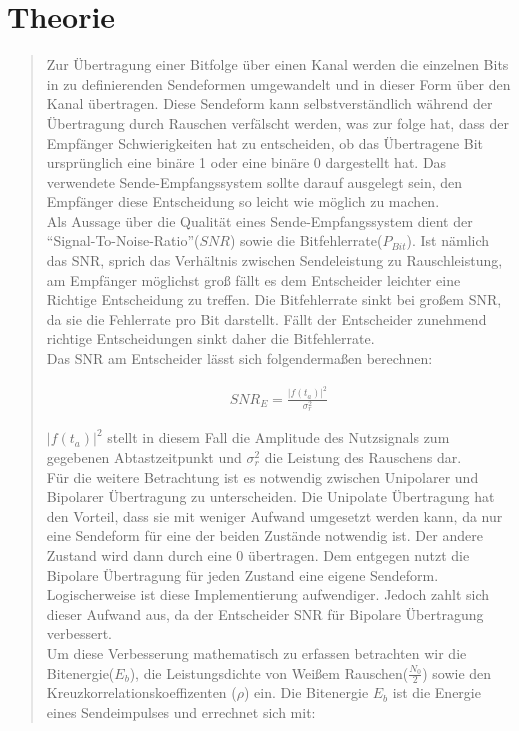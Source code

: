 \section{Theorie}
\begin{quote}
    Zur Übertragung einer Bitfolge über einen Kanal werden die einzelnen Bits in zu definierenden Sendeformen
    umgewandelt und in dieser Form über den Kanal übertragen. Diese Sendeform kann selbstverständlich während der
    Übertragung durch Rauschen verfälscht werden, was zur folge hat, dass der Empfänger Schwierigkeiten hat zu
    entscheiden, ob das Übertragene Bit ursprünglich eine binäre 1 oder eine  binäre 0 dargestellt hat. Das verwendete
    Sende-Empfangssystem sollte darauf ausgelegt sein, den Empfänger diese Entscheidung so leicht wie möglich zu
    machen.\\
    Als Aussage über die Qualität eines Sende-Empfangssystem dient der ``Signal-To-Noise-Ratio''($SNR$) sowie die
    Bitfehlerrate($P_{Bit}$). Ist nämlich das SNR, sprich das Verhältnis zwischen Sendeleistung zu Rauschleistung, am
    Empfänger möglichst groß fällt es dem Entscheider leichter eine Richtige Entscheidung zu treffen. Die Bitfehlerrate
    sinkt bei großem SNR, da sie die Fehlerrate pro Bit darstellt. Fällt der Entscheider zunehmend richtige
    Entscheidungen sinkt daher die Bitfehlerrate.\\
    Das SNR am Entscheider lässt sich folgendermaßen berechnen:
    
    \begin{equation*}
    	\begin{split}
    		SNR_E = \frac{|f(t_a)|^2}{\sigma_r^2}
    	\end{split}
    \end{equation*}
    
    $|f(t_a)|^2$ stellt in diesem Fall die Amplitude des Nutzsignals zum gegebenen Abtastzeitpunkt und $\sigma_r^2$ die
    Leistung des Rauschens dar.\\
    
    Für die weitere Betrachtung ist es notwendig zwischen Unipolarer und Bipolarer Übertragung zu unterscheiden. Die
    Unipolate Übertragung hat den Vorteil, dass sie mit weniger Aufwand umgesetzt werden kann, da nur eine Sendeform für
    eine der beiden Zustände notwendig ist. Der andere Zustand wird dann durch eine 0 übertragen. Dem entgegen nutzt die
    Bipolare Übertragung für jeden Zustand eine eigene Sendeform. Logischerweise ist diese Implementierung aufwendiger.
    Jedoch zahlt sich dieser Aufwand aus, da der Entscheider SNR für Bipolare Übertragung verbessert.\\
    Um diese Verbesserung mathematisch zu erfassen betrachten wir die Bitenergie($E_b$), die Leistungsdichte von Weißem
    Rauschen($\frac{N_0}{2}$) sowie den Kreuzkorrelationskoeffizenten ($\rho$) ein. Die Bitenergie $E_b$ ist die Energie
    eines Sendeimpulses und errechnet sich mit: \cite{Bitenergie}
    

\end{quote}
